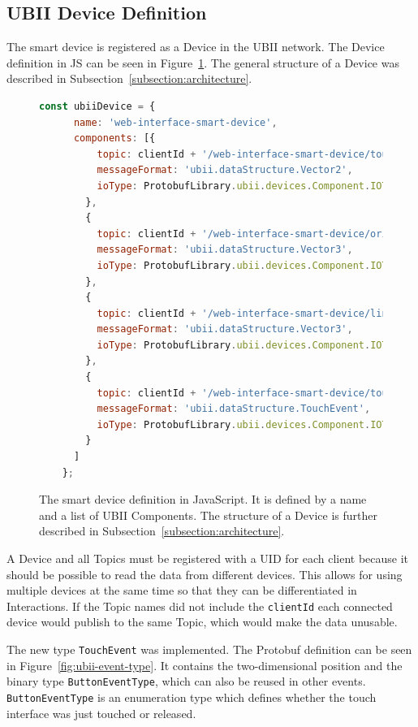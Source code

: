 \subsection{UBII Device Definition}\label{subsection:ubii-device-definition}

The smart device is registered as a Device in the \gls{UBII} network. The Device definition in \gls{JS} can be seen in Figure~\ref{fig:ubii-device-registration}. The general structure of a Device was described in Subsection~\ref{subsection:architecture}.

\begin{figure}[H]
	\begin{lstlisting}[language=JavaScript]
    const ubiiDevice = {
      name: 'web-interface-smart-device',
      components: [{
          topic: clientId + '/web-interface-smart-device/touch_position',
          messageFormat: 'ubii.dataStructure.Vector2',
          ioType: ProtobufLibrary.ubii.devices.Component.IOType.INPUT
        },
        {
          topic: clientId + '/web-interface-smart-device/orientation',
          messageFormat: 'ubii.dataStructure.Vector3',
          ioType: ProtobufLibrary.ubii.devices.Component.IOType.INPUT
        },
        {
          topic: clientId + '/web-interface-smart-device/linear_acceleration',
          messageFormat: 'ubii.dataStructure.Vector3',
          ioType: ProtobufLibrary.ubii.devices.Component.IOType.INPUT
        },
        {
          topic: clientId + '/web-interface-smart-device/touch_events',
          messageFormat: 'ubii.dataStructure.TouchEvent',
          ioType: ProtobufLibrary.ubii.devices.Component.IOType.INPUT
        }
      ]
    };
  \end{lstlisting}
	\caption[Protobuf definition of the smart device]{The smart device definition in JavaScript. It is defined by a name and a list of \gls{UBII} Components. The structure of a Device is further described in Subsection~\ref{subsection:architecture}.}\label{fig:ubii-device-registration}
\end{figure}

A Device and all Topics must be registered with a \gls{UID} for each client because it should be possible to read the data from different devices. This allows for using multiple devices at the same time so that they can be differentiated in Interactions. If the Topic names did not include the \lstinline{clientId} each connected device would publish to the same Topic, which would make the data unusable.

The new type \lstinline{TouchEvent} was implemented. The \gls{Protobuf} definition can be seen in Figure~\ref{fig:ubii-event-type}. It contains the two-dimensional position and the binary type \mbox{\lstinline{ButtonEventType},} which can also be reused in other events. \lstinline{ButtonEventType} is an enumeration type which defines whether the touch interface was just touched or released.

